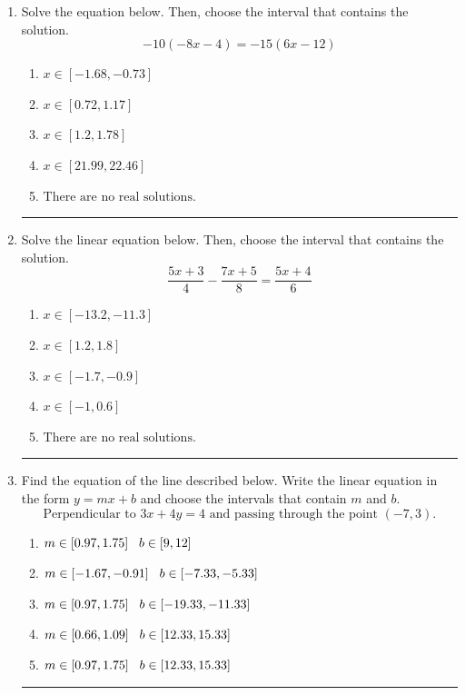 \documentclass[14pt]{extbook}
\newcommand{\litem}[1]{\item#1\hspace*{-1cm}\rule{\textwidth}{0.4pt}}
\begin{document}
\begin{enumerate}
{\begin{enumerate}[label=\Alph*.]
\end{enumerate} }
\litem{
Solve the equation below. Then, choose the interval that contains the solution.\[ -10(-8x -4) = -15(6x -12) \]\begin{enumerate}[label=\Alph*.]
\item \( x \in [-1.68, -0.73] \)
\item \( x \in [0.72, 1.17] \)
\item \( x \in [1.2, 1.78] \)
\item \( x \in [21.99, 22.46] \)
\item \( \text{There are no real solutions.} \)

\end{enumerate} }
\litem{
Solve the linear equation below. Then, choose the interval that contains the solution.\[ \frac{5x + 3}{4} - \frac{7x + 5}{8} = \frac{5x + 4}{6} \]\begin{enumerate}[label=\Alph*.]
\item \( x \in [-13.2, -11.3] \)
\item \( x \in [1.2, 1.8] \)
\item \( x \in [-1.7, -0.9] \)
\item \( x \in [-1, 0.6] \)
\item \( \text{There are no real solutions.} \)

\end{enumerate} }
\litem{
Find the equation of the line described below. Write the linear equation in the form $ y=mx+b $ and choose the intervals that contain $m$ and $b$.\[ \text{Perpendicular to } 3 x + 4 y = 4 \text{ and passing through the point } (-7, 3). \]\begin{enumerate}[label=\Alph*.]
\item \( m \in [0.97, 1.75] \hspace*{3mm} b \in [9, 12] \)
\item \( m \in [-1.67, -0.91] \hspace*{3mm} b \in [-7.33, -5.33] \)
\item \( m \in [0.97, 1.75] \hspace*{3mm} b \in [-19.33, -11.33] \)
\item \( m \in [0.66, 1.09] \hspace*{3mm} b \in [12.33, 15.33] \)
\item \( m \in [0.97, 1.75] \hspace*{3mm} b \in [12.33, 15.33] \)


\end{enumerate}}
\end{enumerate}
\end{document}
